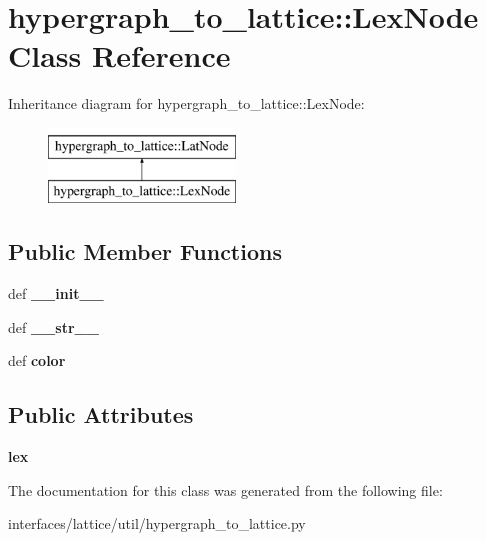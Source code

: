 \hypertarget{classhypergraph__to__lattice_1_1LexNode}{
\section{hypergraph\_\-to\_\-lattice::LexNode Class Reference}
\label{classhypergraph__to__lattice_1_1LexNode}
}
Inheritance diagram for hypergraph\_\-to\_\-lattice::LexNode:\begin{figure}[H]
\begin{center}
\leavevmode
\includegraphics[height=2cm]{classhypergraph__to__lattice_1_1LexNode}
\end{center}
\end{figure}
\subsection*{Public Member Functions}
\begin{DoxyCompactItemize}
\item 
\hypertarget{classhypergraph__to__lattice_1_1LexNode_a4590bd3338438e9a4503139d3b87c8a6}{
def {\bfseries \_\-\_\-init\_\-\_\-}}
\label{classhypergraph__to__lattice_1_1LexNode_a4590bd3338438e9a4503139d3b87c8a6}

\item 
\hypertarget{classhypergraph__to__lattice_1_1LexNode_a8d84f84f121b5dd8c78610da59973e5d}{
def {\bfseries \_\-\_\-str\_\-\_\-}}
\label{classhypergraph__to__lattice_1_1LexNode_a8d84f84f121b5dd8c78610da59973e5d}

\item 
\hypertarget{classhypergraph__to__lattice_1_1LexNode_aa77fc7f927aac2f4b4607b51bf1442bc}{
def {\bfseries color}}
\label{classhypergraph__to__lattice_1_1LexNode_aa77fc7f927aac2f4b4607b51bf1442bc}

\end{DoxyCompactItemize}
\subsection*{Public Attributes}
\begin{DoxyCompactItemize}
\item 
\hypertarget{classhypergraph__to__lattice_1_1LexNode_acb431fe2b2339b8752b9e8daaf59d781}{
{\bfseries lex}}
\label{classhypergraph__to__lattice_1_1LexNode_acb431fe2b2339b8752b9e8daaf59d781}

\end{DoxyCompactItemize}


The documentation for this class was generated from the following file:\begin{DoxyCompactItemize}
\item 
interfaces/lattice/util/hypergraph\_\-to\_\-lattice.py\end{DoxyCompactItemize}
